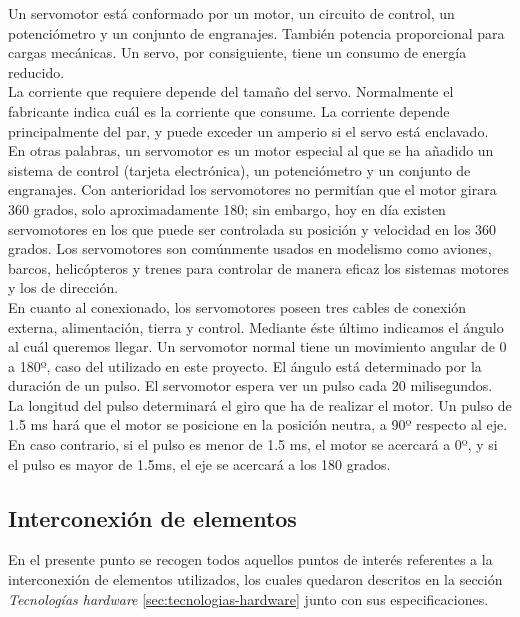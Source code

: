 Un servomotor está conformado por un motor, un circuito de control, un potenciómetro y un conjunto de engranajes. También potencia proporcional para cargas mecánicas. Un servo,
por consiguiente, tiene un consumo de energía reducido.\\

La corriente que requiere depende del tamaño del servo. Normalmente el fabricante indica cuál es la corriente que consume. La corriente depende principalmente del par, y puede
exceder un amperio si el servo está enclavado.\\

En otras palabras, un servomotor es un motor especial al que se ha añadido un sistema de control (tarjeta electrónica), un potenciómetro y un conjunto de engranajes. Con 
anterioridad los servomotores no permitían que el motor girara 360 grados, solo aproximadamente 180; sin embargo, hoy en día existen servomotores en los que puede ser controlada
su posición y velocidad en los 360 grados. Los servomotores son comúnmente usados en modelismo como aviones, barcos, helicópteros y trenes para controlar de manera eficaz los sistemas
motores y los de dirección.\\

En cuanto al conexionado, los servomotores poseen tres cables de conexión externa, alimentación, tierra y control. Mediante éste último indicamos el ángulo al cuál queremos llegar. 
Un servomotor normal tiene un movimiento angular de 0 a 180º, caso del utilizado en este proyecto. El ángulo está determinado por la duración de un pulso. El servomotor 
espera ver un pulso cada 20 milisegundos. La longitud del pulso determinará el giro que ha de realizar el motor. Un pulso de 1.5 ms hará que el motor se posicione en la posición 
neutra, a 90º respecto al eje. En caso contrario, si el pulso es menor de 1.5 ms,  el motor se acercará a 0º, y si el pulso es mayor de 1.5ms, el eje se acercará a los 180 grados.\\

\subsection{Interconexión de elementos}

En el presente punto se recogen todos aquellos puntos de interés referentes a la interconexión de elementos utilizados, los cuales quedaron descritos en la sección \emph{Tecnologías hardware}
\ref{sec:tecnologias-hardware} junto con sus especificaciones.\\

